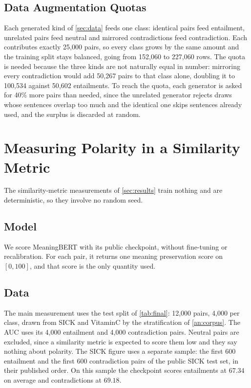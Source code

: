 \documentclass[11pt]{article}
\begin{document}
\subsection{Data Augmentation Quotas}

Each generated kind of \autoref{sec:data} feeds one class: identical pairs feed entailment, unrelated pairs feed neutral and mirrored contradictions feed contradiction.
Each contributes exactly 25{,}000 pairs, so every class grows by the same amount and the training split stays balanced, going from 152{,}060 to 227{,}060 rows.
The quota is needed because the three kinds are not naturally equal in number: mirroring every contradiction would add 50{,}267 pairs to that class alone, doubling it to 100{,}534 against 50{,}602 entailments.
To reach the quota, each generator is asked for 40\% more pairs than needed, since the unrelated generator rejects draws whose sentences overlap too much and the identical one skips sentences already used, and the surplus is discarded at random.

\section{Measuring Polarity in a Similarity Metric}
\label{an:failure}

The similarity-metric measurements of \autoref{sec:results} train nothing and are deterministic, so they involve no random seed.

\subsection{Model}

We score MeaningBERT \citep{beauchemin2023meaningbert} with its public checkpoint, without fine-tuning or recalibration.
For each pair, it returns one meaning preservation score on $[0, 100]$, and that score is the only quantity used.

\subsection{Data}

The main measurement uses the test split of \autoref{tab:final}: 12{,}000 pairs, 4{,}000 per class, drawn from SICK and VitaminC by the stratification of \autoref{an:corpus}.
The AUC uses its 4{,}000 entailment and 4{,}000 contradiction pairs. Neutral pairs are excluded, since a similarity metric is expected to score them low and they say nothing about polarity.
The SICK figure uses a separate sample: the first 600 entailment and the first 600 contradiction pairs of the public SICK test set, in their published order.
On this sample the checkpoint scores entailments at $67.34$ on average and contradictions at $69.18$.
\end{document}
